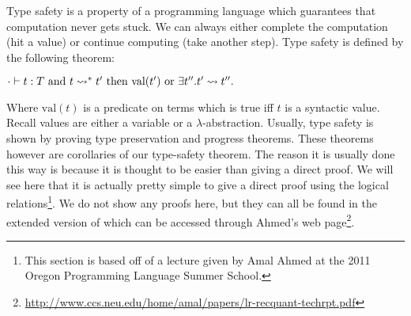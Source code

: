 Type safety is a property of a programming language which guarantees
that computation never gets stuck.  We can always either complete the
computation (hit a value) or continue computing (take another
step). Type safety is defined by the following theorem:
\begin{thm}
  \label{thm:type_safety}
  \begin{math}
    \cdot \vdash t : T \text{ and } t \rightsquigarrow^* t' \text{ then }
    \text{val}(t') \text{ or } \exists t''.t' \rightsquigarrow t''.
  \end{math}
\end{thm}
\noindent
Where $\text{val}(t)$ is a predicate on terms which is true iff $t$ is
a syntactic value.  Recall values are either a variable or a
$\lambda$-abstraction.  Usually, type safety is shown by proving type
preservation and progress theorems.  These theorems however are
corollaries of our type-safety theorem.  The reason it is usually done
this way is because it is thought to be easier than giving a direct
proof.  We will see here that it is actually pretty simple to give a
direct proof using the logical relations\footnote{This section is
  based off of a lecture given by Amal Ahmed at the 2011 Oregon
  Programming Language Summer School.}.  We do not show any proofs
here, but they can all be found in the extended version of
\cite{Ahmed:2006} which can be accessed through Ahmed's web
page\footnote{\url{http://www.ccs.neu.edu/home/amal/papers/lr-recquant-techrpt.pdf}}.

